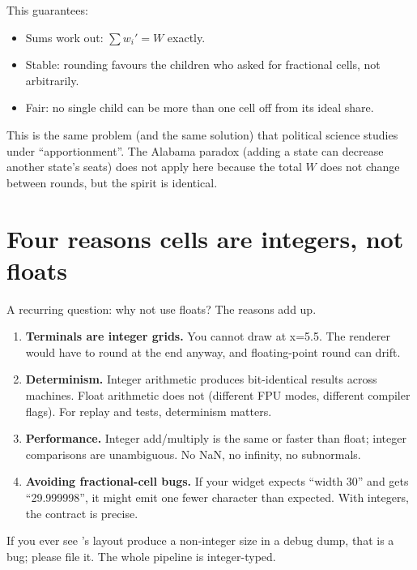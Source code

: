 This guarantees:

\begin{itemize}[leftmargin=*]
  \item Sums work out: $\sum w_i' = W$ exactly.
  \item Stable: rounding favours the children who asked for
    fractional cells, not arbitrarily.
  \item Fair: no single child can be more than one cell off
    from its ideal share.
\end{itemize}

\begin{idea}
This is the same problem (and the same solution) that political
science studies under ``apportionment''. The Alabama paradox
(adding a state can decrease another state's seats) does not
apply here because the total $W$ does not change between
rounds, but the spirit is identical.
\end{idea}

\section{Four reasons cells are integers, not floats}

A recurring question: why not use floats? The reasons add up.

\begin{enumerate}[leftmargin=*]
  \item \textbf{Terminals are integer grids.} You cannot draw at
    x=5.5. The renderer would have to round at the end anyway,
    and floating-point round can drift.
  \item \textbf{Determinism.} Integer arithmetic produces
    bit-identical results across machines. Float arithmetic
    does not (different FPU modes, different compiler flags).
    For replay and tests, determinism matters.
  \item \textbf{Performance.} Integer add/multiply is the same
    or faster than float; integer comparisons are unambiguous.
    No NaN, no infinity, no subnormals.
  \item \textbf{Avoiding fractional-cell bugs.} If your widget
    expects ``width 30'' and gets ``29.999998'', it might emit
    one fewer character than expected. With integers, the
    contract is precise.
\end{enumerate}

\begin{warning}
If you ever see \maya{}'s layout produce a non-integer size in
a debug dump, that is a bug; please file it. The whole pipeline
is integer-typed.
\end{warning}

